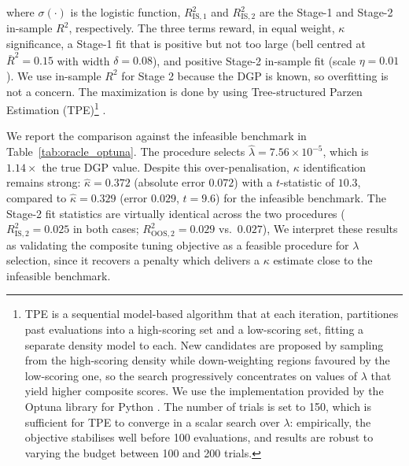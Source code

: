 where $\sigma(\cdot)$ is the logistic function, $R^2_{\text{IS},1}$ and $R^2_{\text{IS},2}$ are the Stage-1 and Stage-2 in-sample $R^2$, respectively. The three terms reward, in equal weight, $\kappa$ significance, a Stage-1 fit that is positive but not too large (bell centred at $\bar R^2 = 0.15$ with width $\delta = 0.08$), and positive Stage-2 in-sample fit (scale $\eta = 0.01$). We use in-sample $R^2$ for Stage 2 because the DGP is known, so overfitting is not a concern.
The maximization is done by using Tree-structured Parzen Estimation (TPE)\footnote{ TPE is a sequential model-based algorithm that at each iteration, partitiones past evaluations into a high-scoring set and a low-scoring set, fitting a separate density model to each. New candidates are proposed by sampling from the high-scoring density while down-weighting regions favoured by the low-scoring one, so the search progressively concentrates on values of $\lambda$ that yield higher composite scores. We use the implementation provided by the Optuna library for Python \citep{optuna_2019}. The number of trials is set to 150, which is sufficient for TPE to converge in a scalar search over $\lambda$: empirically, the objective stabilises well before 100 evaluations, and results are robust to varying the budget between 100 and 200 trials.} .

We report the comparison against the infeasible benchmark in Table~\ref{tab:oracle_optuna}.
The procedure selects $\hat\lambda = 7.56\times10^{-5}$, which is $1.14\times$ the true DGP value.
Despite this over-penalisation, $\kappa$ identification remains strong: $\hat\kappa = 0.372$ (absolute error $0.072$) with a $t$-statistic of $10.3$, compared to $\hat\kappa = 0.329$ (error $0.029$, $t = 9.6$) for the infeasible benchmark. 
The Stage-2 fit statistics are virtually identical across the two procedures ($R^2_{\text{IS},2} = 0.025$ in both cases; $R^2_{\text{OOS},2} = 0.029$ vs.\ $0.027$), 
We interpret these results as validating the composite tuning objective as a feasible procedure for $\lambda$ selection, since it
recovers a penalty which delivers a $\kappa$ estimate close to the infeasible benchmark.

